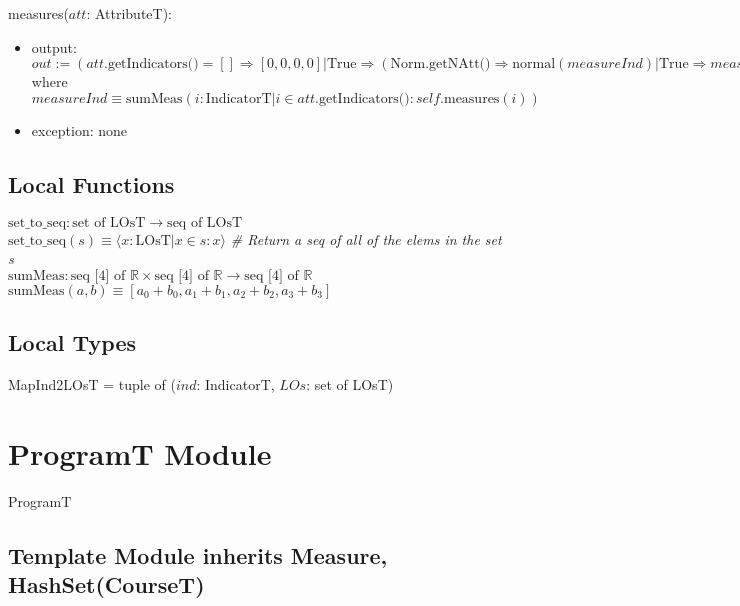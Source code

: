 \documentclass[12pt]{article}
\begin{document}
\noindent measures($\mathit{att}$: AttributeT):
\begin{itemize}
\item output:
  $out := (\mathit{att}.\text{getIndicators()} = [] \Rightarrow [0, 0, 0, 0] |
  \text{True} \Rightarrow (\text{Norm.getNAtt()} \Rightarrow \text{normal} (\mathit{measureInd})
  | \text{True} \Rightarrow \mathit{measureInd} ))$ \newline where $\mathit{measureInd}
  \equiv \text{sumMeas}(\mathit{i}: \text{IndicatorT} | \mathit{i} \in
  \mathit{att}.\text{getIndicators()} :
  \mathit{self}.\text{measures}(i))$
\item exception: none
\end{itemize}

\subsection*{Local Functions}

\noindent $\mbox{set\_to\_seq}: \text{set of } \text{LOsT} \rightarrow \mbox{seq of }
\text{LOsT}$\\
\noindent
$\mbox{set\_to\_seq}(s) \equiv \langle x: \text{LOsT} | x \in s : x \rangle$
\textit{\# Return a seq of all of the elems in the set s}
~\\

\noindent $\mbox{sumMeas}: \text{seq [4] of } \mathbb{R} \times \text{seq
  [4] of } \mathbb{R} \rightarrow \text{seq [4] of } \mathbb{R}$\\
\noindent
$\mbox{sumMeas}(a, b) \equiv [a_0 + b_0, a_1 + b_1, a_2 + b_2, a_3 + b_3]$

\subsection*{Local Types}

\noindent MapInd2LOsT = tuple of ($\mathit{ind}$: IndicatorT, $\mathit{LOs}$: set
of LOsT)

\newpage

\section* {ProgramT Module}

ProgramT

\subsection* {Template Module inherits Measure, HashSet(CourseT)}
\end{document}
